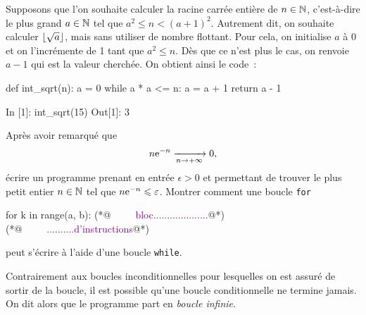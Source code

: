 \documentclass{magnolia}
\begin{document}
Supposons que l'on souhaite calculer la racine carrée
entière de $n\in\mathbb{N}$, c'est-à-dire le plus grand $a\in\mathbb{N}$ tel que $a^2 \leq n < (a+1)^2$.
Autrement dit, on souhaite calculer $\left\lfloor\sqrt{a}\right\rfloor$, mais sans utiliser de nombre
flottant. Pour cela, on initialise $a$ à 0 et on l'incrémente de 1 tant que $a^2 \leq n$.
Dès que ce n'est plus le cas, on renvoie $a-1$ qui est la valeur cherchée. On obtient
ainsi le code~:
\begin{pythoncodeline}
def int_sqrt(n):
    a = 0
    while a * a <= n:
        a = a + 1
    return a - 1
\end{pythoncodeline}


\begin{pythoncode}
In [1]: int_sqrt(15)
Out[1]: 3
\end{pythoncode}



\begin{exos}
\exo Après avoir remarqué que
  \[n {\rm e}^{-n}\xrightarrow[n\rightarrow +\infty]{}0,\]
  écrire un programme prenant en entrée $\epsilon>0$ et permettant de trouver le plus petit entier $n\in\mathbb{N}$ tel que
  $n {\rm e}^{-n} \leqslant \varepsilon$.
\exo Montrer comment une boucle \verb_for_
\begin{pythoncode}
for k in range(a, b):
(*@\textcolor{purple}{\ \ \ \ \ bloc....................}@*)
(*@\textcolor{purple}{\ \ \ \ \ ..........d'instructions}@*)
\end{pythoncode}
peut s'écrire à l'aide d'une boucle \verb_while_.
\end{exos}
\vspace{2ex}
Contrairement aux boucles inconditionnelles pour lesquelles on est assuré
de sortir de la boucle, il est possible qu'une boucle conditionnelle ne termine jamais.
On dit alors que le programme part en \emph{boucle infinie}. 
\end{document}
